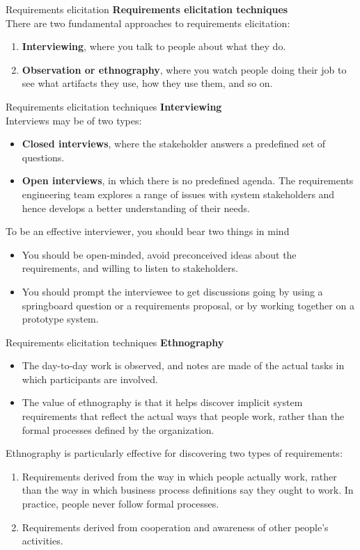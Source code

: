 \documentclass{beamer}
\begin{document}
\begin{frame}{Requirements elicitation}
	\textbf{Requirements elicitation techniques}\\
	There are two fundamental approaches to requirements elicitation:
	\begin{enumerate}
		\item \textbf{Interviewing}, where you talk to people about what they do.
		\item \textbf{Observation or ethnography}, where you watch people doing their job to see what artifacts     they use, how they use them, and so on.
	\end{enumerate}
\end{frame}
\begin{frame}{Requirements elicitation techniques}
	\textbf{Interviewing}\\
	Interviews may be of two types:
	\begin{itemize}
		\item \textbf{Closed interviews}, where the stakeholder answers a predefined set of questions.
		\item \textbf{Open interviews}, in which there is no predefined agenda. The requirements engineering team explores a range of issues with system stakeholders and hence develops a better understanding of their needs.
	\end{itemize}
To be an effective interviewer, you should bear two things in mind
\begin{itemize}
	\item You should be open-minded, avoid preconceived ideas about the requirements, 
	and willing to listen to stakeholders.
	\item You should prompt the interviewee to get discussions going by using a springboard 
	question or a requirements proposal, or by working together on a prototype 
	system.
\end{itemize}
\end{frame}
\begin{frame}{Requirements elicitation techniques}
	\textbf{Ethnography}
	\begin{itemize}
		\item The day-to-day work is observed, and notes are made of the actual tasks in which participants  are involved. 
		\item The value of ethnography is that it helps discover implicit system requirements that reflect the actual ways that people work, rather than the formal processes defined by the organization.
	\end{itemize}
Ethnography is particularly effective for discovering two types of requirements:
\begin{enumerate}
	\item Requirements derived from the way in which people actually work, rather than the way in which business process definitions say they ought to work. In practice, people never    follow formal processes. 
	
	\item Requirements derived from cooperation and awareness of other people’s activities.
	
\end{enumerate}
\end{frame}
\end{document}
